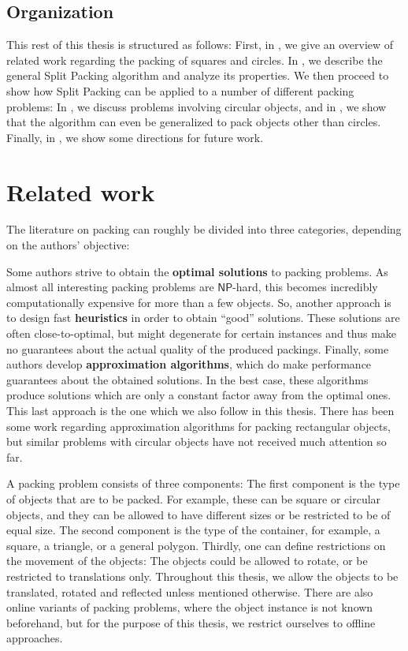 \documentclass[a4paper,style=print,bibliography=totoc,nexus,lnum,extramargin]{tubsbook}
\begin{document}
\section{Organization}

This rest of this thesis is structured as follows:
First, in \textbf{}, we give an overview of related work regarding the packing of squares and circles.
In \textbf{}, we describe the general Split Packing algorithm and analyze its properties.
We then proceed to show how Split Packing can be applied to a number of different packing problems: In \textbf{}, we discuss problems involving circular objects, and in \textbf{}, we show that the algorithm can even be generalized to pack objects other than circles.
Finally, in \textbf{}, we show some directions for future work.

\chapter{Related work}\label{ch:related-work}

The literature on packing can roughly be divided into three categories, depending on the authors' objective:

Some authors strive to obtain the \textbf{optimal solutions} to packing problems. As almost all interesting packing problems are $\mathsf{NP}$-hard, this becomes incredibly computationally expensive for more than a few objects.
So, another approach is to design fast \textbf{heuristics} in order to obtain “good” solutions. These solutions are often close-to-optimal, but might degenerate for certain instances and thus make no guarantees about the actual quality of the produced packings.
Finally, some authors develop \textbf{approximation algorithms}, which do make performance guarantees about the obtained solutions. In the best case, these algorithms produce solutions which are only a constant factor away from the optimal ones. This last approach is the one which we also follow in this thesis. There has been some work regarding approximation algorithms for packing rectangular objects, but similar problems with circular objects have not received much attention so far.

A packing problem consists of three components: The first component is the type of objects that are to be packed. For example, these can be square or circular objects, and they can be allowed to have different sizes or be restricted to be of equal size. The second component is the type of the container, for example, a square, a triangle, or a general polygon. Thirdly, one can define restrictions on the movement of the objects: The objects could be allowed to rotate, or be restricted to translations only. Throughout this thesis, we allow the objects to be translated, rotated and reflected unless mentioned otherwise. There are also online variants of packing problems, where the object instance is not known beforehand, but for the purpose of this thesis, we restrict ourselves to offline approaches.
\end{document}
